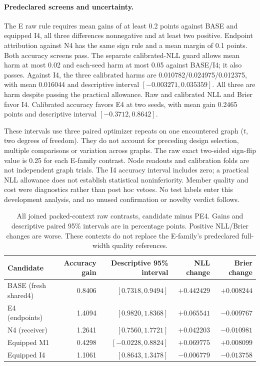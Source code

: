 \paragraph{Predeclared screens and uncertainty.}
The E raw rule requires mean gains of at least 0.2 points against BASE and equipped I4, all three differences nonnegative and at least two positive. Endpoint attribution against N4 has the same sign rule and a mean margin of 0.1 points. Both accuracy screens pass. The separate calibrated-NLL guard allows mean harm at most 0.02 and each-seed harm at most 0.05 against BASE/I4; it also passes. Against I4, the three calibrated harms are 0.010782/0.024975/0.012375, with mean 0.016044 and descriptive interval $[-0.003271,0.035359]$. All three are harm despite passing the practical allowance. Raw and calibrated NLL and Brier favor I4. Calibrated accuracy favors E4 at two seeds, with mean gain 0.2465 points and descriptive interval $[-0.3712,0.8642]$.

These intervals use three paired optimizer repeats on one encountered graph ($t$, two degrees of freedom). They do not account for preceding design selection, multiple comparisons or variation across graphs. The raw exact two-sided sign-flip value is 0.25 for each E-family contrast. Node readouts and calibration folds are not independent graph trials. The I4 accuracy interval includes zero; a practical NLL allowance does not establish statistical noninferiority. Member quality and cost were diagnostics rather than post hoc vetoes. No test labels enter this development analysis, and no unused confirmation or novelty verdict follows.

\begin{table}[t]
\centering\small\setlength{\tabcolsep}{4pt}
\caption{All joined packed-context raw contrasts, candidate minus PE4. Gains and descriptive paired 95\% intervals are in percentage points. Positive NLL/Brier changes are worse. These contexts do not replace the E-family's predeclared full-width quality references.}
\label{tab:PE-contrasts}
\begin{tabular}{lrrrr}
\toprule
Candidate & Accuracy gain & Descriptive 95\% interval & NLL change & Brier change\\
\midrule
BASE (fresh shared4) & 0.8406 & $[0.7318,0.9494]$ & $+0.442429$ & $+0.008244$\\
E4 (endpoints) & 1.4094 & $[0.9820,1.8368]$ & $+0.065541$ & $-0.009767$\\
N4 (receiver) & 1.2641 & $[0.7560,1.7721]$ & $+0.042203$ & $-0.010981$\\
Equipped M1 & 0.4298 & $[-0.0228,0.8824]$ & $+0.069775$ & $+0.008099$\\
Equipped I4 & 1.1061 & $[0.8643,1.3478]$ & $-0.006779$ & $-0.013758$\\
\bottomrule\end{tabular}\end{table}


